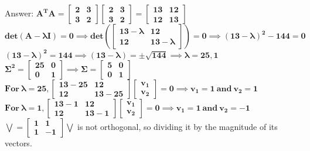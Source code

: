 \documentclass{article}%
\begin{document}
\begin{enumerate}
    Answer:   $\mathbf{ A^T A = \begin{bmatrix} 2 & 3 \\ 3 & 2 \end{bmatrix} \begin{bmatrix} 2 & 3 \\ 3 & 2 \end{bmatrix} = \begin{bmatrix} 13 & 12 \\ 12 & 13 \end{bmatrix} }$ \\
    $\mathbf{ det(A - \lambda I) =  0 \implies det( \begin{bmatrix} 13 - \lambda & 12 \\ 12 & 13 - \lambda \end{bmatrix} ) = 0 \implies (13 - \lambda)^2 - 144 = 0} $ \\
    $\mathbf{ (13 - \lambda)^2 = 144 \implies (13 - \lambda) = \pm \sqrt{144} \implies \lambda = 25, 1 }$ \\
    $\mathbf{ \Sigma^2 = \begin{bmatrix} 25 & 0 \\ 0 & 1 \end{bmatrix} \implies \Sigma = \begin{bmatrix} 5 & 0 \\ 0 & 1 \end{bmatrix} }$ \\
    $\mathbf{ For \ \lambda = 25, \begin{bmatrix} 13 - 25 & 12 \\ 12 & 13 - 25 \end{bmatrix} \begin{bmatrix} v_1 \\ v_2 \end{bmatrix} = 0 \implies v_1 = 1 \ and \ v_2 = 1 }$ \\
    $\mathbf{ For \ \lambda = 1, \begin{bmatrix} 13 - 1 & 12 \\ 12 & 13 - 1 \end{bmatrix} \begin{bmatrix} v_1 \\ v_2 \end{bmatrix} = 0 \implies v_1 = 1 \ and \ v_2 = -1 }$ \\
    $\mathbf{ \bigvee = \begin{bmatrix} 1 & 1 \\ 1 & -1 \end{bmatrix} \bigvee }$ is not orthogonal, so dividing it by the magnitude of its vectors. \\

\end{enumerate}
\end{document}
